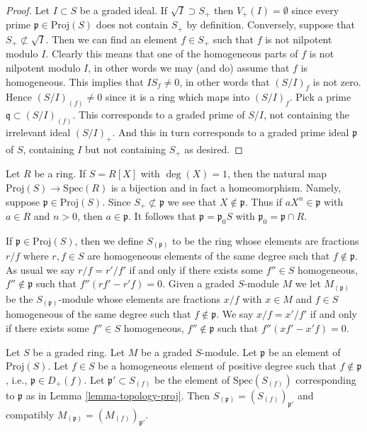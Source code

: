 \begin{proof}
\medskip\noindent
Let $I \subset S$ be a graded ideal.
If $\sqrt{I} \supset S_{+}$ then $V_{+}(I) = \emptyset$ since
every prime $\mathfrak p \in \text{Proj}(S)$ does not contain
$S_{+}$ by definition. Conversely, suppose that
$S_{+} \not \subset \sqrt{I}$. Then we can find an element
$f \in S_{+}$ such that $f$ is not nilpotent modulo $I$.
Clearly this means that one of the homogeneous parts of $f$
is not nilpotent modulo $I$, in other words we may (and do)
assume that $f$ is homogeneous. This implies that
$I S_f \not = 0$, in other words that $(S/I)_f$ is not
zero. Hence $(S/I)_{(f)} \not = 0$ since it is a ring
which maps into $(S/I)_f$. Pick a prime
$\mathfrak q \subset (S/I)_{(f)}$. This corresponds to
a graded prime of $S/I$, not containing the irrelevant ideal
$(S/I)_{+}$. And this in turn corresponds to a graded prime
ideal $\mathfrak p$ of $S$, containing $I$ but not containing $S_{+}$
as desired.
\end{proof}

\begin{example}
\label{example-proj-polynomial-ring-1-variable}
Let $R$ be a ring. If $S = R[X]$ with $\deg(X) = 1$, then the natural map
$\text{Proj}(S) \to \text{Spec}(R)$ is a bijection and in fact a homeomorphism.
Namely, suppose $\mathfrak p \in \text{Proj}(S)$. Since
$S_{+} \not \subset \mathfrak p$ we see that $X \not \in \mathfrak p$.
Thus if $aX^n \in \mathfrak p$ with $a \in R$ and $n > 0$, then
$a \in \mathfrak p$. It follows that $\mathfrak p = \mathfrak p_0S$
with $\mathfrak p_0 = \mathfrak p \cap R$.
\end{example}

\noindent
If $\mathfrak p \in \text{Proj}(S)$, then we
define $S_{(\mathfrak p)}$ to be the ring whose
elements are fractions $r/f$ where $r, f \in S$ are homogeneous
elements of the same degree such that $f \not\in \mathfrak p$.
As usual we say $r/f = r'/f'$ if and only if there exists
some $f'' \in S$ homogeneous, $f'' \not \in \mathfrak p$ such
that $f''(rf' - r'f) = 0$.
Given a graded $S$-module $M$ we let
$M_{(\mathfrak p)}$ be the $S_{(\mathfrak p)}$-module
whose elements are fractions $x/f$ with $x \in M$
and $f \in S$ homogeneous of the same degree such that
$f \not \in \mathfrak p$. We say $x/f = x'/f'$
if and only if there exists some $f'' \in S$ homogeneous,
$f'' \not \in \mathfrak p$ such that $f''(xf' - x'f) = 0$.

\begin{lemma}
\label{lemma-proj-prime}
Let $S$ be a graded ring. Let $M$ be a graded $S$-module.
Let $\mathfrak p$ be an element of $\text{Proj}(S)$.
Let $f \in S$ be a homogeneous element of positive degree
such that $f \not \in \mathfrak p$, i.e., $\mathfrak p \in D_{+}(f)$.
Let $\mathfrak p' \subset S_{(f)}$ be the element of
$\text{Spec}(S_{(f)})$ corresponding to $\mathfrak p$ as in
Lemma \ref{lemma-topology-proj}. Then
$S_{(\mathfrak p)} = (S_{(f)})_{\mathfrak p'}$
and compatibly
$M_{(\mathfrak p)} = (M_{(f)})_{\mathfrak p'}$.
\end{lemma}

